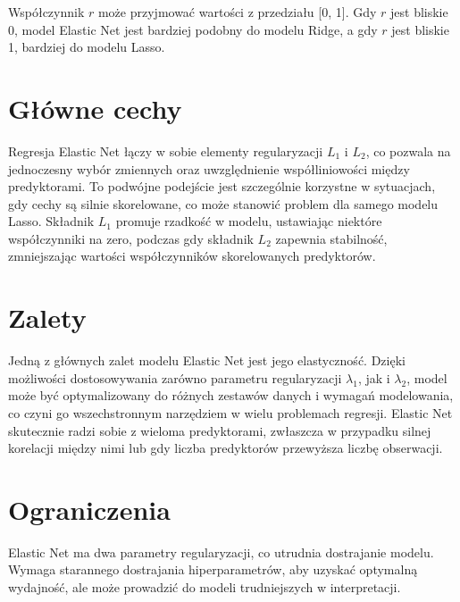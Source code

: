 \hspace{1.5cm} Współczynnik $r$ może przyjmować wartości z przedziału [0, 1]. Gdy $r$ jest bliskie 0, model Elastic Net jest bardziej podobny do modelu Ridge, a gdy $r$ jest bliskie 1, bardziej do modelu Lasso.

{}
\section*{Główne cechy}
\vspace{-1.0em}

\hspace{1.5cm} Regresja Elastic Net łączy w sobie elementy regularyzacji $L_1$ i $L_2$, co pozwala na jednoczesny wybór zmiennych oraz uwzględnienie współliniowości między predyktorami. To podwójne podejście jest szczególnie korzystne w sytuacjach, gdy cechy są silnie skorelowane, co może stanowić problem dla samego modelu Lasso. Składnik $L_1$ promuje rzadkość w modelu, ustawiając niektóre współczynniki na zero, podczas gdy składnik $L_2$ zapewnia stabilność, zmniejszając wartości współczynników skorelowanych predyktorów.


{}
\section*{Zalety }
\vspace{-1.0em}


\hspace{1.5cm} Jedną z głównych zalet modelu Elastic Net jest jego elastyczność.
Dzięki możliwości dostosowywania zarówno parametru regularyzacji $\lambda_1$, jak i $\lambda_2$, model może być optymalizowany do różnych zestawów danych i wymagań modelowania, co czyni go wszechstronnym narzędziem w wielu problemach regresji.
Elastic Net skutecznie radzi sobie z wieloma predyktorami, zwłaszcza w przypadku silnej korelacji między nimi lub gdy liczba predyktorów przewyższa liczbę obserwacji.

{}
\section*{Ograniczenia }
\vspace{-1.0em}

\hspace{1.5cm} Elastic Net ma dwa parametry regularyzacji, co utrudnia dostrajanie modelu. Wymaga starannego dostrajania hiperparametrów, aby uzyskać optymalną wydajność, ale może prowadzić do modeli trudniejszych w interpretacji.


